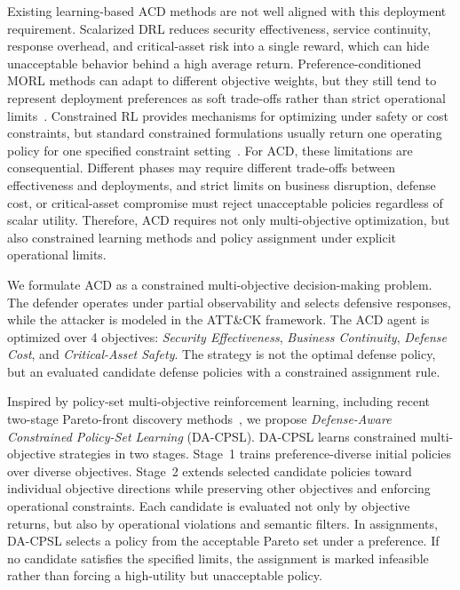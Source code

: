 \documentclass[sigconf,review,anonymous]{acmart}
\begin{document}
Existing learning-based ACD methods are not well aligned with this deployment requirement.
Scalarized DRL reduces security effectiveness, service continuity, response overhead, and critical-asset risk into a single reward, which can hide unacceptable behavior behind a high average return.
Preference-conditioned MORL methods can adapt to different objective weights, but they still tend to represent deployment preferences as soft trade-offs rather than strict operational limits~\cite{vanmoffaert2013scalarized,yang2019generalized,basaklar2022pdmorl,lu2023morl,roijers2013survey,hayes2022practical}.
Constrained RL provides mechanisms for optimizing under safety or cost constraints, but standard constrained formulations usually return one operating policy for one specified constraint setting~\cite{altman2021cmdp,achiam2017cpo,liu2020ipo,paternain2019duality}.
For ACD, these limitations are consequential. Different phases may require different trade-offs between effectiveness and deployments, and strict limits on business disruption, defense cost, or critical-asset compromise must reject unacceptable policies regardless of scalar utility.
Therefore, ACD requires not only multi-objective optimization, but also constrained learning methods and policy assignment under explicit operational limits.

We formulate ACD as a constrained multi-objective decision-making problem.
The defender operates under partial observability and selects defensive responses, while the attacker is modeled in the ATT\&CK framework.
The ACD agent is optimized over 4 objectives: \emph{Security Effectiveness}, \emph{Business Continuity}, \emph{Defense Cost}, and \emph{Critical-Asset Safety}.
The strategy is not the optimal defense policy, but an evaluated candidate defense policies with a constrained assignment rule.

Inspired by policy-set multi-objective reinforcement learning, including recent two-stage Pareto-front discovery methods~\cite{roijers2013survey,hayes2022practical,liu2025cmorl}, we propose \emph{Defense-Aware Constrained Policy-Set Learning} (DA-CPSL). 
DA-CPSL learns constrained multi-objective strategies in two stages. 
Stage~1 trains preference-diverse initial policies over diverse objectives. 
Stage~2 extends selected candidate policies toward individual objective directions while preserving other objectives and enforcing operational constraints. 
Each candidate is evaluated not only by objective returns, but also by operational violations and semantic filters. In assignments, DA-CPSL selects a policy from the acceptable Pareto set under a preference. 
If no candidate satisfies the specified limits, the assignment is marked infeasible rather than forcing a high-utility but unacceptable policy. 
\end{document}
